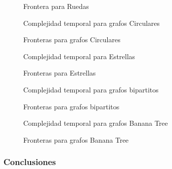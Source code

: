 \begin{figure}[H]
    \centering
    \fontsize{7}{10}\selectfont
    \resizebox{0.87\textwidth}{!}{}
    \caption{Frontera para Ruedas}
\end{figure}

\begin{figure}[H]
    \centering
    \fontsize{7}{10}\selectfont
    \resizebox{0.87\textwidth}{!}{}
    \caption{Complejidad temporal para grafos Circulares}
\end{figure}

\begin{figure}[H]
    \centering
    \fontsize{7}{10}\selectfont
    \resizebox{0.87\textwidth}{!}{}
    \caption{Fronteras para grafos Circulares}
\end{figure}

\begin{figure}[H]
    \centering
    \fontsize{7}{10}\selectfont
    \resizebox{0.87\textwidth}{!}{}
    \caption{Complejidad temporal para Estrellas}
\end{figure}

\begin{figure}[H]
    \centering
    \fontsize{7}{10}\selectfont
    \resizebox{0.87\textwidth}{!}{}
    \caption{Fronteras para Estrellas}
\end{figure}


\begin{figure}[H]
    \centering
    \fontsize{7}{10}\selectfont
    \resizebox{0.87\textwidth}{!}{}
    \caption{Complejidad temporal para grafos bipartitos}
\end{figure}

\begin{figure}[H]
    \centering
    \fontsize{7}{10}\selectfont
    \resizebox{0.87\textwidth}{!}{}
    \caption{Fronteras para grafos bipartitos}
\end{figure}

\begin{figure}[H]
    \centering
    \fontsize{7}{10}\selectfont
    \resizebox{0.87\textwidth}{!}{}
    \caption{Complejidad temporal para grafos Banana Tree}
\end{figure}

\begin{figure}[H]
    \centering
    \fontsize{7}{10}\selectfont
    \resizebox{0.87\textwidth}{!}{}
    \caption{Fronteras para grafos Banana Tree}
\end{figure}

\subsubsection{Conclusiones}

